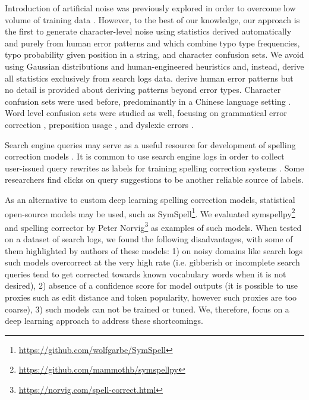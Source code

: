 \documentclass[11pt,a4paper]{article}
\begin{document}
Introduction of artificial noise was previously explored in order to overcome low volume of training data \cite{hasan2015spelling,etoori2018automatic,wang2019denoising,choe2019neural,grundkiewicz2019neural}. However, to the best of our knowledge, our approach is the first to generate character-level noise using statistics derived automatically and purely from human error patterns and which combine typo type frequencies, typo probability given position in a string, and character confusion sets. We avoid using Gaussian distributions and human-engineered heuristics and, instead, derive all statistics exclusively from search logs data.  derive human error patterns but no detail is provided about deriving patterns beyond error types. Character confusion sets were used before, predominantly in a Chinese language setting \cite{liu2013hybrid,chen2013study,wang2018hybrid,wang2019confusionset}. Word level confusion sets were studied as well, focusing on grammatical error correction \cite{wang2019denoising,choe2019neural,grundkiewicz2019neural}, preposition usage \cite{rozovskaya2010generating}, and dyslexic errors \cite{pedler2010large}.

Search engine queries may serve as a useful resource for development of spelling correction models  \cite{Cucerzan2004,gao2010large}. It is common to use search engine logs in order to collect user-issued query rewrites as labels for training spelling correction systems \cite{radlinski2005query,zhang2006discriminative,hasan2015spelling,Zhu2019}. Some researchers \cite{gao2010large,sun2010learning,movin2018spelling} find clicks on query suggestions to be another reliable source of labels.

As an alternative to custom deep learning spelling correction models, statistical open-source models may be used, such as SymSpell\footnote{\url{https://github.com/wolfgarbe/SymSpell}}. We evaluated symspellpy\footnote{\url{https://github.com/mammothb/symspellpy}} and spelling corrector by Peter Norvig\footnote{\url{https://norvig.com/spell-correct.html}} as examples of such models. When tested on a dataset of {\fi} search logs, we found the following disadvantages, with some of them highlighted by authors of these models: 1) on noisy domains like search logs such models overcorrect at the very high rate (i.e. gibberish or incomplete search queries tend to get corrected towards known vocabulary words when it is not desired), 2) absence of a confidence score for model outputs (it is possible to use proxies such as edit distance and token popularity, however such proxies are too coarse), 3) such models can not be trained or tuned. We, therefore, focus on a deep learning approach to address these shortcomings.
\end{document}
